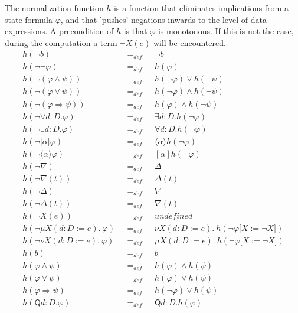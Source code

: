 \documentclass{article}
\begin{document}
The normalization function $h$ is a function that eliminates implications
from a state formula $\varphi $, and that 'pushes' negations inwards to the
level of data expressions. A precondition of $h$ is that $\varphi $ is
monotonous. If this is not the case, during the computation a term $\lnot
X(e)$ will be encountered.%
\begin{equation*}
\begin{array}{lll}
h(\lnot b) & =_{def} & \lnot b \\ 
h(\lnot \lnot \varphi ) & =_{def} & h(\varphi ) \\ 
h(\lnot (\varphi \wedge \psi )) & =_{def} & h(\lnot \varphi )\vee h(\lnot
\psi ) \\ 
h(\lnot (\varphi \vee \psi )) & =_{def} & h(\lnot \varphi )\wedge h(\lnot
\psi ) \\ 
h(\lnot (\varphi \Rightarrow \psi )) & =_{def} & h(\varphi )\wedge h(\lnot
\psi ) \\ 
h(\lnot \forall d{{:}D}.\varphi ) & =_{def} & \exists d{{:}D}.h(\lnot
\varphi ) \\ 
h(\lnot \exists d{{:}D}.\varphi ) & =_{def} & \forall d{{:}D}.h(\lnot
\varphi ) \\ 
h(\lnot \lbrack \alpha ]\varphi ) & =_{def} & \langle \alpha \rangle h(\lnot
\varphi ) \\ 
h(\lnot \langle \alpha \rangle \varphi ) & =_{def} & [\alpha ]h(\lnot
\varphi ) \\ 
h(\lnot \nabla ) & =_{def} & \Delta \\ 
h(\lnot \nabla (t)) & =_{def} & \Delta (t) \\ 
h(\lnot \Delta ) & =_{def} & \nabla \\ 
h(\lnot \Delta (t)) & =_{def} & \nabla (t) \\ 
h(\lnot X(e)) & =_{def} & undefined \\ 
h(\lnot \mu X(d{:}D:=e).~\varphi )~~~ & =_{def}~~~ & \nu X(d{:}%
D:=e).~h(\lnot \varphi \lbrack X:=\lnot X]) \\ 
h(\lnot \nu X(d{:}D:=e).~\varphi )~~~ & =_{def}~~~ & \mu X(d{:}%
D:=e).~h(\lnot \varphi \lbrack X:=\lnot X]) \\ 
h(b) & =_{def} & b \\ 
h(\varphi \wedge \psi ) & =_{def} & h(\varphi )\wedge h(\psi ) \\ 
h(\varphi \vee \psi ) & =_{def} & h(\varphi )\vee h(\psi ) \\ 
h(\varphi \Rightarrow \psi ) & =_{def} & h(\lnot \varphi )\vee h(\psi ) \\ 
h(\mathsf{Q}d{{:}D}.\varphi ) & =_{def} & \mathsf{Q}d{{:}D}.h(\varphi ) \\ 

\end{array}
\end{equation*}
\end{document}
